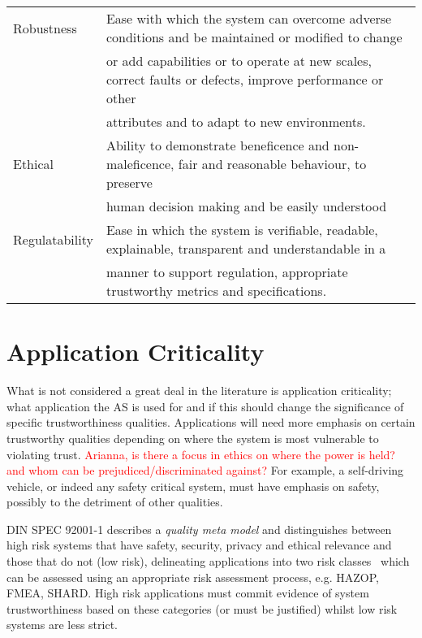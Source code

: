 \begin{table*}[t]
\begin{tabular}{ll}
Robustness & Ease with which the system can overcome adverse conditions and be maintained or modified to change\\
&or add capabilities or to operate at new scales, correct faults or defects, improve performance or other\\
&attributes and to adapt to new environments.\\

Ethical & Ability to demonstrate beneficence and non-maleficence, fair and reasonable behaviour, to preserve\\
&human decision making and be easily understood\\

Regulatability & Ease in which the system is verifiable, readable, explainable, transparent and understandable in a \\
&manner to support regulation, appropriate trustworthy metrics and specifications.\\

\bottomrule
\end{tabular}

\label{tab:ontology}
\end{table*}


\section{Application Criticality} \label{sec:appcrit}

What is not considered a great deal in the literature is application criticality; what application the AS is used for and if this should change the significance of specific trustworthiness qualities. Applications will need more emphasis on certain trustworthy qualities depending on where the system is most vulnerable to violating trust. 
%
\textcolor{red}{Arianna, is there a focus in ethics on where the power is held? and whom can be prejudiced/discriminated against?} 
%
For example, a self-driving vehicle, or indeed any safety critical system, must have emphasis on safety, possibly to the detriment of other qualities. 

DIN SPEC 92001-1 describes a \emph{quality meta model} and distinguishes between high risk systems that have safety, security, privacy and ethical relevance and those that do not (low risk), delineating applications into two risk classes~\cite{Englisch2019} which can be assessed using an appropriate risk assessment process, e.g. HAZOP, FMEA, SHARD. High risk applications must commit evidence of system trustworthiness based on these categories (or must be justified) whilst low risk systems are less strict.

